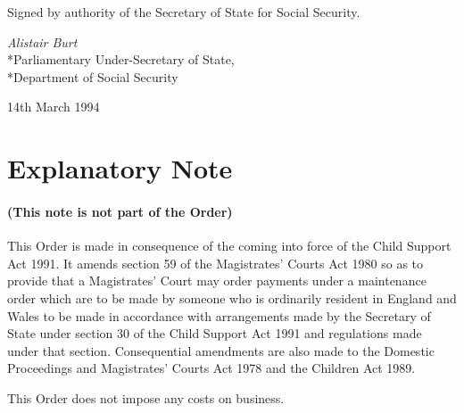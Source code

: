 \documentclass[a4paper]{article}
\newcommand{\parthead}{}
\begin{document}
%

\bigskip

Signed by authority of the Secretary of State for Social Security.

{\raggedleft
\emph{Alistair Burt}\\*Parliamentary Under-Secretary of State,\\*Department of Social Security

}

14th March 1994

\part{Explanatory Note}

\renewcommand\parthead{--- Explanatory Note}

\subsection*{(This note is not part of the Order)}

This Order is made in consequence of the coming into force of the Child Support Act 1991. It amends section 59 of the Magistrates' Courts Act 1980 so as to provide that a Magistrates' Court may order payments under a maintenance order which are to be made by someone who is ordinarily resident in England and Wales to be made in accordance with arrangements made by the Secretary of State under section 30 of the Child Support Act 1991 and regulations made under that section. Consequential amendments are also made to the Domestic Proceedings and Magistrates' Courts Act 1978 and the Children Act 1989.

  This Order does not impose any costs on business.
\end{document}
